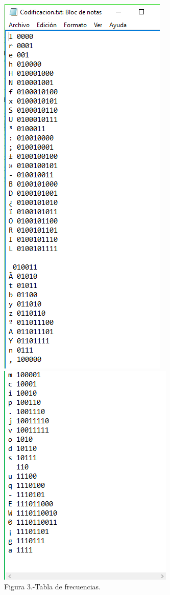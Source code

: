 \documentclass[spanish]{article}
\begin{document}
	\begin{center}
		\includegraphics[scale=.5]{./imagenes/prog4.png}\\
		\includegraphics[scale=.5]{./imagenes/prog5.png}\\
		Figura 3.-Tabla de frecuencias.
	\end{center}
\end{document}
